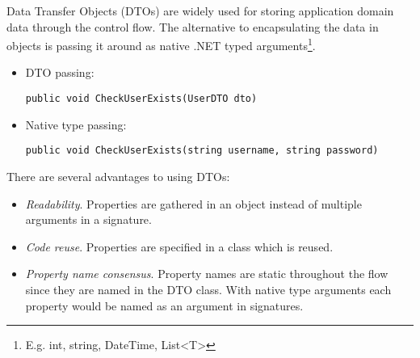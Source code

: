 \documentclass[../report.tex]{subfiles}
\begin{document}
\label{sec:dto}



Data Transfer Objects (DTOs) are widely used for storing application domain data through the control flow. The alternative to encapsulating the data in objects is passing it around as native .NET typed arguments\footnote{E.g. int, string, DateTime, List<T>}.





\begin{itemize}
\item DTO passing:
\begin{center}
\begin{lstlisting}
public void CheckUserExists(UserDTO dto)
\end{lstlisting}
\end{center}

\item Native type passing:
\begin{center}
\begin{lstlisting}
public void CheckUserExists(string username, string password)
\end{lstlisting}
\end{center}
\end{itemize}

There are several advantages to using DTOs:

\begin{itemize}
\item \textit{Readability}. Properties are gathered in an object instead of multiple arguments in a signature.

\item \textit{Code reuse}. Properties are specified in a class which is reused.

\item \textit{Property name consensus}. Property names are static throughout the flow since they are named in the DTO class. With native type arguments each property would be named as an argument in signatures.
\end{itemize}
\end{document}
